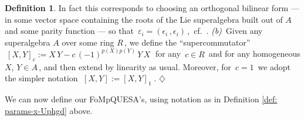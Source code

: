 \documentclass[12pt,reqno,twoside,a4paper]{amsart}
\numberwithin{equation}{section}
\theoremstyle{definition}
\newtheorem{definition}[lema]{Definition}
\newtheorem{free text}[lema]{}
\theoremstyle{remark}
\theoremstyle{plain}
\begin{document}
\begin{definition}
In fact this corresponds to choosing an orthogonal bilinear form
 --- in some vector space containing the roots of the Lie superalgebra built out of  $ A $  and some parity function ---   so that
 $ \,\varepsilon_i = (\epsilon_i \, , \epsilon_i) \, $,  \,cf.\ \cite{Ya2}.
%
\vskip5pt
%
   \textit{(b)}\,  Given any superalgebra  $ A $  over some ring  $ R \, $,
   we define the ``supercommutator''
   $ \: {[X,Y]}_c := X \, Y - c \, {(-1)}^{p(X){}p(Y)} \, Y \, X \; $
   for any  $ \, c \in R \, $  and for any homogeneous  $ X $,  $ Y \in A \, $,
   and then extend by linearity as usual.  Moreover, for  $ \, c = 1 \, $
   we adopt the simpler notation  $ \; [X,Y] := {[X,Y]}_1 \; $.   \hfill
   $ \diamondsuit $
%
\end{definition}

\vskip7pt

   We can now define our FoMpQUESA's, using notation as in
   Definition \ref{def: params-x-Uphgd}  above.

\vskip11pt
\end{document}

